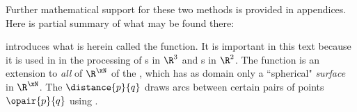 %

Further mathematical support for these two methods is provided in appendices.
Here is partial summary of what may be found there:

\begin{minipage}{\tw-50mm}\imarks
   introduces what is herein called the  function.
  It is important in this text because it is used in  in the processing of s 
  in $\R^3$ and s in $\R^2$.
  The function is an extension to \emph{all} of $\R^\xN$ of the , which has as domain
  only a ``spherical" \emph{surface} in $\R^\xN$.
  The  $\distance{p}{q}$ draws arcs between certain pairs of points $\opair{p}{q}$ using 
  .
\end{minipage}\hfill{}
    

